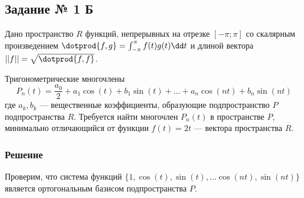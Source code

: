 \subsection{Задание № 1 Б}

Дано пространство \(R\) функций, непрерывных на отрезке \([-\pi; \pi]\)
со скалярным произведением
\(\dotprod{f, g} = \int_{-\pi}^{\pi} f(t) g(t) \dd t \)
и длиной вектора \(||f|| = \sqrt{\dotprod{f, f}}\).

Тригонометрические многочлены
\[
  P_{n}(t) = \frac{a_0}{2} + a_1 \cos(t) + b_1 \sin(t) + \ldots
  + a_n \cos(n t) + b_n \sin(n t)
\]
где \(a_k, b_k\) --- вещественные коэффициенты,
образующие подпространство \(P\) подпространства \(R\).
Требуется найти многочлен \(P_{n}(t)\) в пространстве \(P\),
минимально отличающийся от функции \(f(t) = 2t\)
--- вектора пространства \(R\).

\subsubsection{Решение}

Проверим, что система функций
\(\{1, \cos(t), \sin(t), \ldots \cos(nt), \sin(nt)\}\)
является ортогональным базисом подпространства \(P\).

